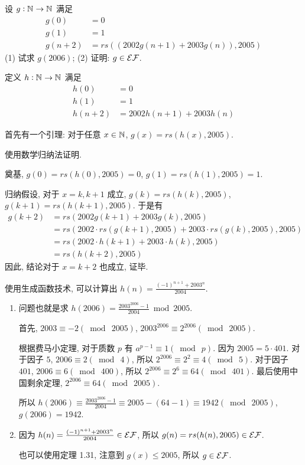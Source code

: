 \begin{problem}
设 $g: \mathbb{N}^{} \to \mathbb{N}^{}$ 满足
\begin{align*}
g(0) & = 0 \\
g(1) & = 1 \\
g(n + 2) & = rs((2002g(n+1)+2003g(n)), 2005)
\end{align*}
(1) 试求 $g(2006)$; (2) 证明: $g \in \mathcal{EF}$.
\end{problem}

\begin{solution}
定义 $h : \mathbb{N}^{} \to \mathbb{N}^{}$ 满足
\begin{align*}
h(0) & = 0 \\
h(1) & = 1 \\
h(n + 2) & = 2002h(n+1)+2003h(n)
\end{align*}

首先有一个引理: 对于任意 $x \in \mathbb{N}^{}$, $g(x) = rs(h(x), 2005)$.

使用数学归纳法证明.

奠基, $g(0) = rs(h(0), 2005) = 0$, $g(1) = rs(h(1), 2005) = 1$.

归纳假设, 对于 $x = k, k + 1$ 成立, $g(k) = rs(h(k), 2005)$, $g(k+1) = rs(h(k+1), 2005)$. 于是有
\begin{align*}
g(k+2) & = rs(2002g(k+1)+2003g(k), 2005) \\
& = rs(2002 \cdot rs(g(k+1), 2005) + 2003 \cdot rs(g(k), 2005), 2005) \\
& = rs(2002 \cdot h(k+1) + 2003 \cdot h(k), 2005) \\
& = rs(h(k+2), 2005)
\end{align*}
因此, 结论对于 $x = k + 2$ 也成立, 证毕.

使用生成函数技术, 可以计算出 $h(n) = \frac{(-1)^{n+1}+2003^n}{2004}$.

\begin{enumerate}
\item 问题也就是求 $h(2006) = \frac{2003^{2006}-1}{2004} \bmod 2005$.

首先, $2003 \equiv -2 (\bmod ~ 2005)$, $2003^{2006} \equiv 2^{2006} (\bmod ~ 2005)$.

根据费马小定理, 对于质数 $p$ 有 $a^{p-1} \equiv 1 (\bmod ~ p)$. 因为 $2005 = 5 \cdot 401$. 对于因子 $5$, $2006 \equiv 2 (\bmod ~ 4)$, 所以 $2^{2006} \equiv 2^2 \equiv 4 (\bmod ~ 5)$. 对于因子 $401$, $2006 \equiv 6 (\bmod ~ 400)$, 所以 $2^{2006} \equiv 2^6 \equiv 64 (\bmod ~ 401)$. 最后使用中国剩余定理, $2^{2006} \equiv 64 (\bmod ~ 2005)$.

所以 $h(2006) \equiv \frac{2003^{2006}-1}{2004} \equiv 2005 - (64 - 1) \equiv 1942 (\bmod ~ 2005)$, $g(2006) = 1942$.
\item 因为 $h(n) = \frac{(-1)^{n+1}+2003^n}{2004} \in \mathcal{EF}$, 所以 $g(n) = rs(h(n), 2005) \in \mathcal{EF}$.

也可以使用定理 1.31, 注意到 $g(x) \le 2005$, 所以 $g \in \mathcal{EF}$.
\end{enumerate}
\end{solution}